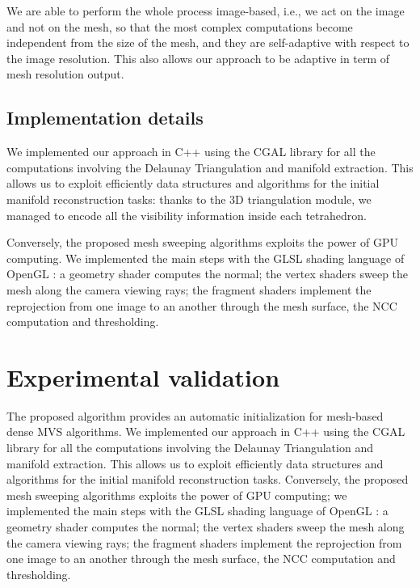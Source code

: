 We are able to perform the whole process image-based, i.e., we act on the image and not on the mesh, so that the most complex computations become independent from the size of the mesh, and they are self-adaptive with respect to the  image resolution. This also allows our approach to be adaptive in term of mesh resolution output.

\subsection{Implementation details}
We implemented our approach in C++ using the CGAL library \cite{cgal} for all the computations involving the Delaunay Triangulation and manifold extraction. This allows us to exploit efficiently data structures and algorithms for the initial manifold reconstruction tasks: thanks to the 3D triangulation module, we managed to encode all the visibility information inside each tetrahedron.

Conversely, the proposed mesh sweeping algorithms exploits the power of GPU computing. 
We implemented the main steps with the GLSL shading language of OpenGL \cite{opengl}: a geometry shader computes the normal; the vertex shaders sweep the mesh along the camera viewing rays; the fragment shaders implement the reprojection from one image to an another through the mesh surface, the NCC computation and thresholding.


\section{Experimental validation}
The proposed algorithm provides an automatic initialization for mesh-based dense MVS algorithms.
We implemented our approach in C++ using the CGAL library \cite{cgal} for all the computations involving the Delaunay Triangulation and manifold extraction. This allows us to exploit efficiently data structures and algorithms for the initial manifold reconstruction tasks.
Conversely, the proposed mesh sweeping algorithms exploits the power of GPU computing; we implemented the main steps with the GLSL shading language of OpenGL \cite{opengl}: a geometry shader computes the normal; the vertex shaders sweep the mesh along the camera viewing rays; the fragment shaders implement the reprojection from one image to an another through the mesh surface, the NCC computation and thresholding.



